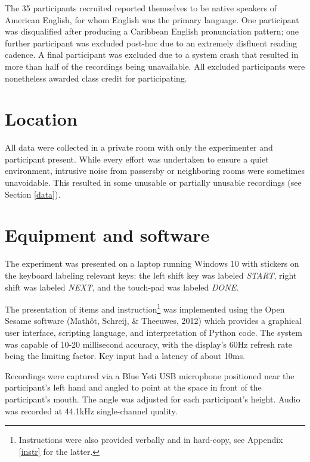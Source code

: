 \documentclass[11pt,oneside]{book}
\let\rmarkdownfootnote\footnote%
\def\footnote{\protect\rmarkdownfootnote}
\begin{document}
The 35 participants recruited reported themselves to be native speakers of American English, for whom English was the primary language. One participant was disqualified after producing a Caribbean English pronunciation pattern; one further participant was excluded post-hoc due to an extremely disfluent reading cadence. A final participant was excluded due to a system crash that resulted in more than half of the recordings being unavailable. All excluded participants were nonetheless awarded class credit for participating.

\hypertarget{location}{%
\section{Location}\label{location}}

All data were collected in a private room with only the experimenter and participant present. While every effort was undertaken to ensure a quiet environment, intrusive noise from passersby or neighboring rooms were sometimes unavoidable. This resulted in some unusable or partially unusable recordings (see Section \ref{data}).

\hypertarget{equipment-and-software}{%
\section{Equipment and software}\label{equipment-and-software}}

The experiment was presented on a laptop running Windows 10 with stickers on the keyboard labeling relevant keys: the left shift key was labeled \emph{START}, right shift was labeled \emph{NEXT}, and the touch-pad was labeled \emph{DONE}.

The presentation of items and instruction\footnote{Instructions were also provided verbally and in hard-copy, see Appendix \ref{instr} for the latter.} was implemented using the Open Sesame software (Mathôt, Schreij, \& Theeuwes, 2012) which provides a graphical user interface, scripting language, and interpretation of Python code. The system was capable of 10-20 millisecond accuracy, with the display's 60Hz refresh rate being the limiting factor. Key input had a latency of about 10ms.

Recordings were captured via a Blue Yeti USB microphone positioned near the participant's left hand and angled to point at the space in front of the participant's mouth. The angle was adjusted for each participant's height. Audio was recorded at 44.1kHz single-channel quality.
\end{document}

